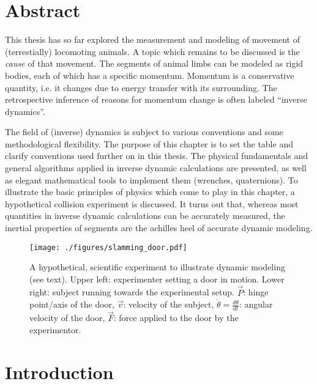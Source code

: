 \clearpage


\section{Abstract}
\label{sec:orgccad056}
This thesis has so far explored the measurement and modeling of movement of (terrestially) locomoting animals.
A topic which remains to be discussed is the \emph{cause} of that movement.
The segments of animal limbs can be modeled as rigid bodies, each of which has a specific momentum.
Momentum is a conservative quantity, i.e. it changes due to energy transfer with its surrounding.
The retrospective inference of reasons for momentum change is often labeled ``inverse dynamics''.

The field of (inverse) dynamics is subject to various conventions and some methodological flexibility.
The purpose of this chapter is to set the table and clarify conventions used further on in this thesis.
The physical fundamentals and general algorithms applied in inverse dynamic calculations are presented, as well as elegant mathematical tools to implement them (wrenches, quaternions).
To illustrate the basic principles of physics which come to play in this chapter, a hypothetical collision experiment is discussed.
It turns out that, whereas most quantities in inverse dynamic calculations can be accurately measured, the inertial properties of segments are the achilles heel of accurate dynamic modeling.



\begin{figure}[p]
\centering
\texttt{[image: ./figures/slamming\_door.pdf]}
\caption{\label{fig:slamming}A hypothetical, scientific experiment to illustrate dynamic modeling (see text). Upper left: experimenter setting a door in motion. Lower right: subject running towards the experimental setup. \(\vec{P}\): hinge point/axis of the door, \(\vec{v}\): velocity of the subject, \(\dot\theta = \frac{d\theta}{dt}\): angular velocity of the door, \(\vec{F}\): force applied to the door by the experimentor.}
\end{figure}


\FloatBarrier\clearpage
\section{Introduction}
\label{sec:org96863cd}
